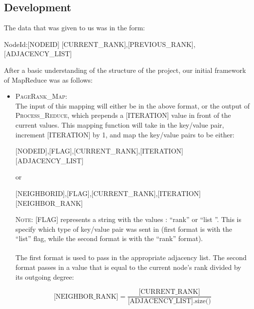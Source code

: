 \documentclass{article}
\begin{document}
\subsection*{Development}
The data that was given to us was in the form: 
{
\begin{center}
NodeId:[NODEID] \hspace{8mm} [CURRENT\_RANK],[PREVIOUS\_RANK],[ADJACENCY\_LIST]
\end{center}
}
\noindent After a basic understanding of the structure of the project, our initial framework of MapReduce was as follows:
    \begin{itemize}
        \item \textsc{PageRank\_Map}: \\
        The input of this mapping will either be in the above format, or the output of \textsc{Process\_Reduce}, which prepends a [ITERATION] value in front of the current values. This mapping function will take in the key/value pair, increment [ITERATION] by 1, and map the key/value pairs to be either:
        \begin{center}
        [NODEID],[FLAG],[CURRENT\_RANK],[ITERATION] \hspace{8mm} [ADJACENCY\_LIST]
        \end{center}
        or
        \begin{center}
        [NEIGHBORID],[FLAG],[CURRENT\_RANK],[ITERATION] \hspace{8mm} [NEIGHBOR\_RANK]
        \end{center}

        \textsc{Note:} [FLAG] represents a string with the values : ``rank'' or ``list
        ''. This is specify which type of key/value pair was sent in (first format is with the ``list'' flag, while the second format is with the ``rank'' format).  
        \\ \\
        \noindent The first format is used to pass in the appropriate adjacency list. The second format passes in a value that is equal to the current node's rank divided by its outgoing degree:

        $$\text{[NEIGHBOR\_RANK]} = \frac{\text{[CURRENT\_RANK]}}{\text{[ADJACENCY\_LIST].size()}}$$


\end{itemize}
\end{document}
